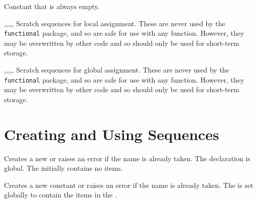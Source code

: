 \documentclass[oneside]{book}
\begin{document}
\begin{variable}{\cEmptySeq}
Constant that is always empty.
\end{variable}

\begin{variable}{\lTmpaSeq,\lTmpbSeq,\lTmpcSeq,\lTmpiSeq,\lTmpjSeq,\lTmpkSeq}
Scratch sequences for local assignment. These are never used by
the \verb!functional! package, and so are safe for use with any
function. However, they may be overwritten by other
code and so should only be used for short-term storage.
\end{variable}

\begin{variable}{\gTmpaSeq,\gTmpbSeq,\gTmpcSeq,\gTmpiSeq,\gTmpjSeq,\gTmpkSeq}
Scratch sequences for global assignment. These are never used by
the \verb!functional! package, and so are safe for use with any
function. However, they may be overwritten by other
code and so should only be used for short-term storage.
\end{variable}

\section{Creating and Using Sequences}

\begin{function}{\SeqNew}
\begin{syntax}
 
\end{syntax}
Creates a new  or raises an error if the name is
already taken. The declaration is global. The 
initially contains no items.
\begin{codehigh}
\SeqNew \lFooSomeSeq
\end{codehigh}
\end{function}

\begin{function}{\SeqConstFromClist}
\begin{syntax}
  
\end{syntax}
Creates a new constant  or raises an error if the name
is already taken. The  is set globally to contain the
items in the .
\begin{codehigh}
\SeqConstFromClist {}
\end{codehigh}
\end{function}
\end{document}
